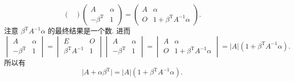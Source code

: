 \documentclass[12pt,fontset=fandol]{ctexart}
\begin{document}
\begin{solve}
\[\begin{pmatrix}
                \end{pmatrix} \begin{pmatrix}
                    A                   & \alpha \\
                    -\beta^{\mathrm{T}} & 1
                \end{pmatrix} = \begin{pmatrix}
                    A & \alpha                           \\
                    O & 1+\beta^{\mathrm{T}}A^{-1}\alpha
                \end{pmatrix}.\]
            注意 $\beta^{\mathrm{T}}A^{-1}\alpha$ 的最终结果是一个数. 进而
            \[\begin{vmatrix}
                    A                   & \alpha \\
                    -\beta^{\mathrm{T}} & 1
                \end{vmatrix} = \begin{vmatrix}
                    E                        & O \\
                    \beta^{\mathrm{T}}A^{-1} & 1
                \end{vmatrix} \begin{vmatrix}
                    A                   & \alpha \\
                    -\beta^{\mathrm{T}} & 1
                \end{vmatrix} = \begin{vmatrix}
                    A & \alpha                           \\
                    O & 1+\beta^{\mathrm{T}}A^{-1}\alpha
                \end{vmatrix} = \lvert A \rvert(1+\beta^{\mathrm{T}}A^{-1}\alpha).\]
            所以有
            \[\lvert A+\alpha \beta^{\mathrm{T}} \rvert = \lvert A \rvert(1+\beta^{\mathrm{T}}A^{-1}\alpha).\]
\end{solve}
\end{document}
